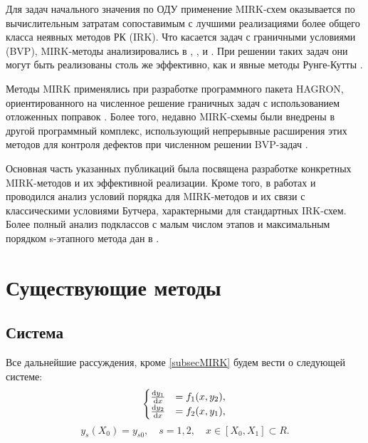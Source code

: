 \documentclass[a4paper,article,14pt]{extarticle}
\begin{document}
Для задач начального значения по ОДУ применение MIRK-схем оказывается по вычислительным затратам сопоставимым с лучшими реализациями более общего класса неявных методов РК (IRK). Что касается задач с граничными условиями (BVP), MIRK-методы анализировались в \cite{Cash1980}, \cite{Cash1982}, \cite{Enright1986} и \cite{Gupta1985}. При решении таких задач они могут быть реализованы столь же эффективно, как и явные методы Рунге-Кутты \cite{Enright1986}.

Методы MIRK применялись при разработке программного пакета HAGRON, ориентированного на численное решение граничных задач с использованием отложенных поправок \cite{Cash1991}. Более того, недавно MIRK-схемы были внедрены в другой программный комплекс, использующий непрерывные расширения этих методов для контроля дефектов при численном решении BVP-задач \cite{Muir1993}.

Основная часть указанных публикаций была посвящена разработке конкретных MIRK-методов и их эффективной реализации. Кроме того, в работах \cite{Bokhoven1980} и \cite{Gupta1985} проводился анализ условий порядка для MIRK-методов и их связи с классическими условиями Бутчера, характерными для стандартных IRK-схем. Более полный анализ подклассов с малым числом этапов и максимальным порядком s-этапного метода дан в \cite{mirk}. 

\pagebreak

\section{Существующие методы}
\subsection{Система}
Все дальнейшие рассуждения, кроме \ref{subsecMIRK} будем вести о следующей системе:
\begin{equation}
\begin{cases}
         \dv{y_1}{x} &= f_1(x,y_2), \\
         \dv{y_2}{x} &= f_2(x,y_1),
\end{cases}
\label{eq:base_system}
\end{equation}
\begin{equation}
    y_{s}(X_{0}) = y_{s0}, \quad s = 1,2, \quad x \in [X_{0},X_{1}] \subset R.
\end{equation}
\end{document}

